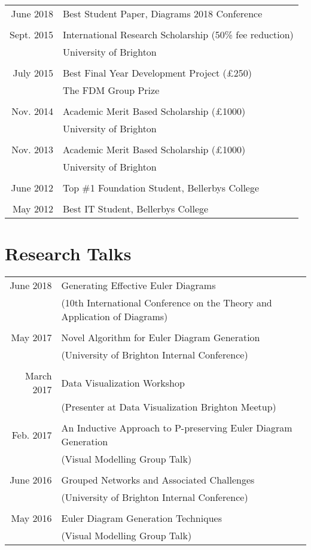 \documentclass[a4paper,11pt]{article} %
\begin{document}
\begin{tabular}{rl}
June 2018 & Best Student Paper, Diagrams 2018 Conference\\
\\
Sept. 2015 & International Research Scholarship (50\% fee reduction)\\ &University of Brighton\\
\\
July 2015 & Best Final Year Development Project (£250)\\ &The FDM Group Prize \\
\\
Nov. 2014 & Academic Merit Based Scholarship (£1000)\\ &University of Brighton \\
\\
Nov. 2013 & Academic Merit Based Scholarship (£1000)\\ &University of Brighton \\
\\
June 2012 & Top \#1 Foundation Student, Bellerbys College \\
\\
May 2012 & Best IT Student, Bellerbys College \\
\end{tabular}




\section{Research Talks}

\begin{center}
\begin{tabular}{rl}
June 2018 & Generating Effective Euler Diagrams\\ & (10th International Conference on the Theory and Application of Diagrams) \\
\\
May 2017 & Novel Algorithm for Euler Diagram Generation\\ & (University of Brighton Internal Conference) \\
\\
March 2017 & Data Visualization Workshop\\ & (Presenter at Data Visualization Brighton Meetup) \\
\\
Feb. 2017 & An Inductive Approach to P-preserving Euler Diagram Generation\\ & (Visual Modelling Group Talk) \\
\\
June 2016 & Grouped Networks and Associated Challenges\\ & (University of Brighton Internal Conference) \\
\\
May 2016 & Euler Diagram Generation Techniques\\ & (Visual Modelling Group Talk) \\
\end{tabular}
\end{center}
\end{document}
